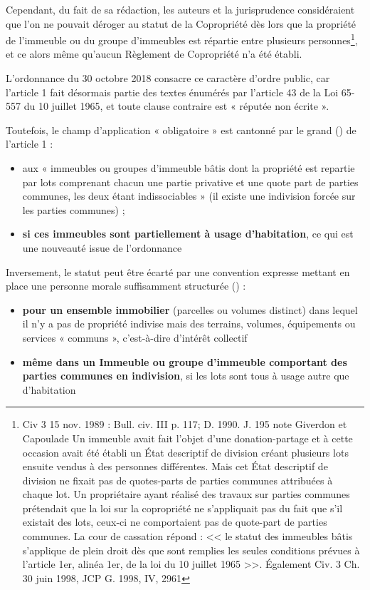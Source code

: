 			Cependant, du fait de sa rédaction, les auteurs et la jurisprudence considéraient que l'on ne
			pouvait déroger au statut de la Copropriété dès lors que la propriété de l'immeuble ou du groupe
			d'immeubles est répartie entre plusieurs personnes\footnote{
			Civ 3\degre{} 15 nov. 1989 : Bull. civ. III  p. 117; D. 1990. J. 195 note Giverdon et Capoulade
			Un immeuble avait fait l'objet d'une donation-partage et à cette occasion avait été établi un État descriptif de division créant plusieurs lots ensuite vendus à des personnes différentes. Mais cet État descriptif de division ne fixait pas de quotes-parts de parties communes attribuées à chaque lot. Un propriétaire ayant réalisé des travaux sur parties communes prétendait que la loi sur la copropriété ne s'appliquait pas du fait que s'il existait des lots, ceux-ci ne comportaient pas de quote-part de parties communes. La cour de cassation répond : << le statut des immeubles bâtis s'applique de plein droit dès que sont remplies les seules conditions prévues à l'article 1er, alinéa 1er, de la loi du 10 juillet 1965 >>.
			Également Civ. 3\degre{} Ch. 30 juin 1998, JCP G. 1998, IV, 2961	
			}, et ce alors même qu'aucun Règlement de Copropriété n'a été établi.
			
			L’ordonnance du 30 octobre 2018 consacre ce caractère d’ordre public, car l’article 1 fait
			désormais partie des textes énumérés par l’article 43 de la Loi 65-557 du 10 juillet 1965, et toute
			clause contraire est « réputée non écrite ».
			
			Toutefois, le champ d’application « obligatoire » est cantonné par le grand (\I) de l’article 1 :
			\begin{itemize}
				\item aux « immeubles ou groupes d’immeuble bâtis dont la propriété est
				repartie par lots comprenant chacun une partie privative et une quote part
				de parties communes, les deux étant indissociables » (il existe une
				indivision forcée sur les parties communes) ;
				\item\textbf{ si ces immeubles sont partiellement à usage d’habitation}, ce qui est une
				nouveauté issue de l’ordonnance
			\end{itemize}
		
			Inversement, le statut peut être écarté par une convention expresse mettant en place une
			personne morale suffisamment structurée (\II) :
			\begin{itemize}
				\item \textbf{pour un ensemble immobilier} (parcelles ou volumes distinct) dans lequel il
				n’y a pas de propriété indivise mais des terrains, volumes, équipements ou
				services « communs », c’est-à-dire d’intérêt collectif
				\item \textbf{même dans un Immeuble ou groupe d’immeuble comportant des parties
				communes en indivision}, si les lots sont tous à usage autre que d’habitation
			\end{itemize}
		
